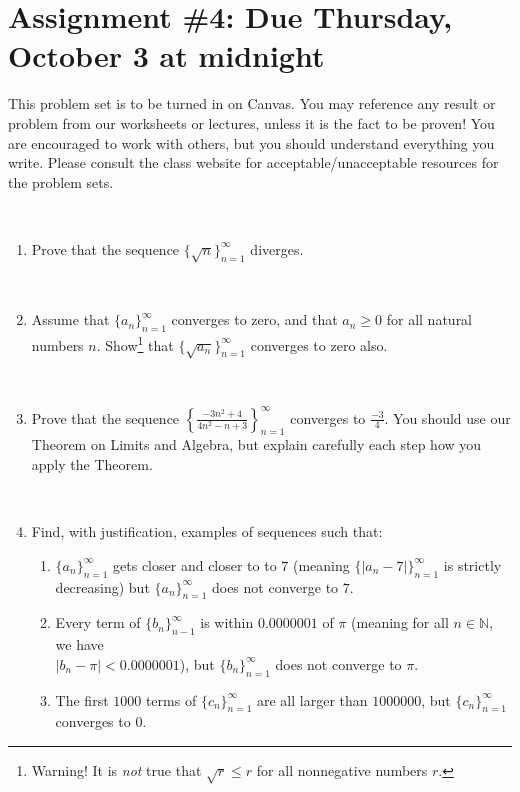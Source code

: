 \documentclass[12pt]{amsart}
\newcommand{\N}{\mathbb{N}}
\newcommand{\showsol}[1]{\def\displaysol{#1}}
\begin{document}
\showsol{1}
	
	\thispagestyle{empty}
	
	\section*{Assignment \#4: Due Thursday, October 3 at midnight}
	
	This problem set is to be turned in on Canvas. You may reference any result or problem from our worksheets or lectures, unless it is the fact to be proven! You are encouraged to work with others, but you should understand everything you write. Please consult the class website for acceptable/unacceptable resources for the problem sets.
	
	\
	
	



\begin{enumerate}

\item Prove that the sequence $\{ \sqrt{n} \}_{n=1}^{\infty}$ diverges.

\

\item Assume that $\{a_n\}_{n=1}^\infty$ converges to zero, and that $a_n\geq 0$ for all natural numbers $n$. Show\footnote{Warning! It is \emph{not} true that $\sqrt{r} \leq r$ for all nonnegative numbers $r$.} that $\{\sqrt{a_n}\}_{n=1}^\infty$ converges to zero also. 

\

\item Prove that the sequence $\displaystyle \left\{ \frac{-3 n^2 + 4}{4 n^2 -n +3 }\right\}_{n=1}^\infty$ converges to $\displaystyle\frac{-3}{4}$. You should use our Theorem on Limits and Algebra, but explain carefully each step how you apply the Theorem.

\

\item Find, with justification, examples of sequences such that:
\begin{enumerate}
\item $\{a_n\}_{n=1}^\infty$ gets closer and closer to to $7$ (meaning $\{|a_n-7|\}_{n=1}^\infty$ is strictly decreasing) but $\{a_n\}_{n=1}^{\infty}$ does not converge to $7$.
\item Every term of $\{b_n\}_{n-1}^\infty$ is within $0.0000001$ of $\pi$ (meaning for all $n\in \N$, we have \\ ${|b_n-\pi|<0.0000001}$), but $\{b_n\}_{n=1}^{\infty}$ does not converge to $\pi$.
\item The first $1000$ terms of $\{c_n\}_{n=1}^\infty$ are all larger than $1000000$, but $\{c_n\}_{n=1}^\infty$ converges to $0$.
\end{enumerate}





\end{enumerate}
\end{document}
